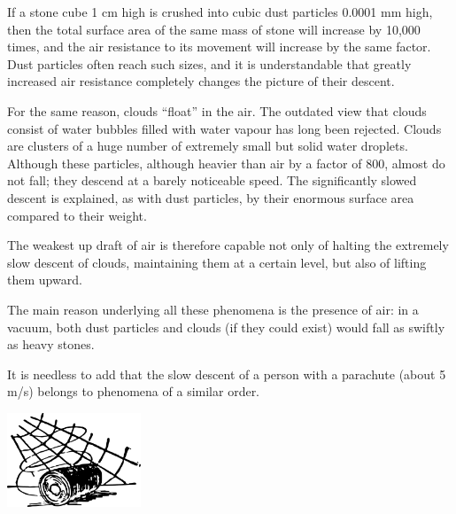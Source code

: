 If a stone cube 1 cm high is crushed into cubic dust particles 0.0001 mm high, then the total surface area of ​​the same mass of stone will increase by 10,000 times, and the air resistance to its movement will increase by the same factor. Dust particles often reach such sizes, and it is understandable that greatly increased air resistance completely changes the picture of their descent.

For the same reason, clouds ``float'' in the air. The outdated view that clouds consist of water bubbles filled with water vapour has long been rejected. Clouds are clusters of a huge number of extremely small but solid water droplets. Although these particles, although heavier than air by a factor of 800, almost do not fall; they descend at a barely noticeable speed. The significantly slowed descent is explained, as with dust particles, by their enormous surface area compared to their weight.

The weakest up draft of air is therefore capable not only of halting the extremely slow descent of clouds, maintaining them at a certain level, but also of lifting them upward.

The main reason underlying all these phenomena is the presence of air: in a vacuum, both dust particles and clouds (if they could exist) would fall as swiftly as heavy stones.

It is needless to add that the slow descent of a person with a parachute (about 5 m/s) belongs to phenomena of a similar order.

\begin{center}
\includegraphics[width=0.3\textwidth]{figures/ch-11/fig-ch-11-tail.pdf}
\end{center}



















